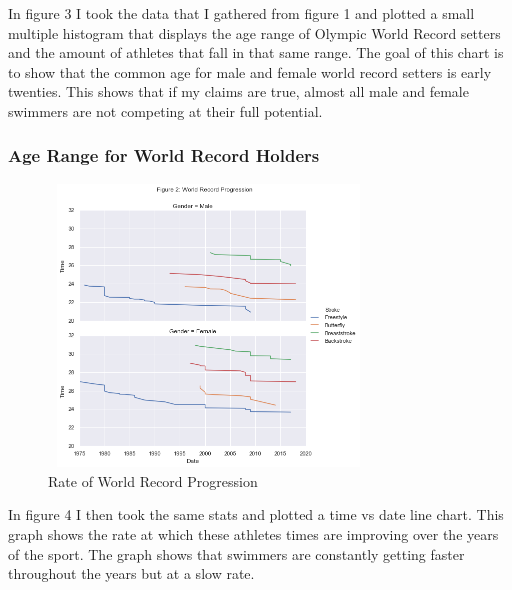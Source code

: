 \documentclass[letterpaper, 10 pt, conference]{ieeeconf}  %
\begin{document}

In figure 3 I took the data that I gathered from figure 1 and plotted a small multiple histogram that displays the age range of Olympic World Record setters and the amount of athletes that fall in that same range. The goal of this chart is to show that the common age for male and female world record setters is early twenties. This shows that if my claims are true, almost all male and female swimmers are not competing at their full potential.

\subsubsection{Age Range for World Record Holders}
\begin{figure}
    \centering
    \includegraphics[width=8.5cm, height=7.5cm]{Rate_of_Progression.png}
    \caption{Rate of World Record Progression}
    \label{Fig 4}
\end{figure}

In figure 4 I then took the same stats and plotted a time vs date line chart. This graph shows the rate at which these athletes times are improving over the years of the sport. The graph shows that swimmers are constantly getting faster throughout the years but at a slow rate.
\end{document}
